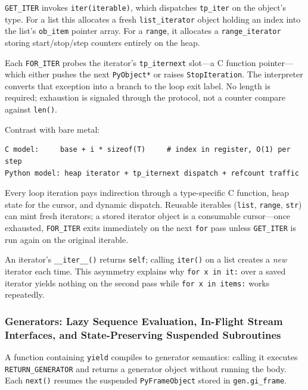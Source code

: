 \documentclass[a4paper,twoside]{report}
\begin{document}
\texttt{GET\_ITER} invokes \texttt{iter(iterable)}, which dispatches \texttt{tp\_iter} on the object's type. For a list this allocates a fresh \texttt{list\_iterator} object holding an index into the list's \texttt{ob\_item} pointer array. For a \texttt{range}, it allocates a \texttt{range\_iterator} storing start/stop/step counters entirely on the heap.

Each \texttt{FOR\_ITER} probes the iterator's \texttt{tp\_iternext} slot---a C function pointer---which either pushes the next \texttt{PyObject*} or raises \texttt{StopIteration}. The interpreter converts that exception into a branch to the loop exit label. No length is required; exhaustion is signaled through the protocol, not a counter compare against \texttt{len()}.

Contrast with bare metal:

\begin{verbatim}
C model:     base + i * sizeof(T)     # index in register, O(1) per step
Python model: heap iterator + tp_iternext dispatch + refcount traffic
\end{verbatim}

Every loop iteration pays indirection through a type-specific C function, heap state for the cursor, and dynamic dispatch. Reusable iterables (\texttt{list}, \texttt{range}, \texttt{str}) can mint fresh iterators; a stored iterator object is a consumable cursor---once exhausted, \texttt{FOR\_ITER} exits immediately on the next \texttt{for} pass unless \texttt{GET\_ITER} is run again on the original iterable.

An iterator's \texttt{\_\_iter\_\_()} returns \texttt{self}; calling \texttt{iter()} on a list creates a \emph{new} iterator each time. This asymmetry explains why \texttt{for x in it:} over a saved iterator yields nothing on the second pass while \texttt{for x in items:} works repeatedly.

\subsubsection{Generators: Lazy Sequence Evaluation, In-Flight Stream Interfaces, and State-Preserving Suspended Subroutines}

A function containing \texttt{yield} compiles to generator semantics: calling it executes \texttt{RETURN\_GENERATOR} and returns a generator object without running the body. Each \texttt{next()} resumes the suspended \texttt{PyFrameObject} stored in \texttt{gen.gi\_frame}.
\end{document}
